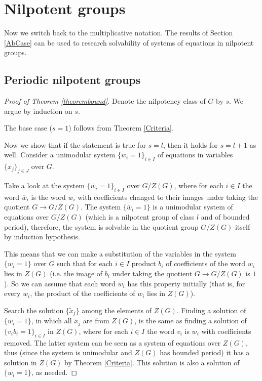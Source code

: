 \documentclass{article}
\theoremstyle{definition}
\theoremstyle{remark}
\let\tilde\widetilde
\begin{document}
\section{Nilpotent groups} \label{NilpCase}

Now we switch back to the multiplicative notation.
The results of Section \ref{AbCase} can be used to research
solvability of systems of equations in nilpotent groups.

\subsection{Periodic nilpotent groups}

\begin{proof}[Proof of Theorem \ref{theorembound}]
Denote the nilpotency class of $G$ by $s$.
We argue by induction on $s$.

The base case ($s=1$) follows from Theorem \ref{Criteria}.

Now we show that if the statement is true for
$s=l$,
then it holds for $s=l+1$ as well.
Consider a unimodular system $\{w_i=1\}_{i\in I}$
of equations in variables $\{x_j\}_{j \in J}$ over $G$.

Take a look at the system $\{\overline{w}_i=1\}_{i\in I}$ over $G/Z(G)$,
where for each $i \in I$ the word $\overline{w}_i$ is
the word $w_i$ with coefficients changed to their images
under taking the quotient $G \to G/Z(G)$.
The system $\{\overline{w}_i=1\}$ is a unimodular system of equations
over $G/Z(G)$ (which is a nilpotent group of class $l$
and of bounded period),
therefore, the system is solvable in the quotient group
$G/Z(G)$ itself by induction hypothesis.

This means that we can make a substitution of the variables
in the system $\{w_i=1\}$ over $G$
such that for each $i \in I$ product $b_i$ of coefficients of the word $w_i$
lies in $Z(G)$
(i.e. the image of $b_i$ under taking the quotient $G \to G/Z(G)$ is $1$).
So we can assume that each word $w_i$ has this property initially
(that is, for every $w_i$, the product of the coefficients of $w_i$ lies in $Z(G)$).

Search the solution $\{\tilde x_j\}$ among the elements of $Z(G)$.
Finding a solution of $\{w_i=1\}$, in which all $\tilde x_j$ are
from $Z(G)$, is the same as finding a solution of $\{v_ib_i=1\}_{i \in I}$
in $Z(G)$, where for each $i \in I$ the word $v_i$ is $w_i$ with coefficients removed.
The latter system can be seen as a system of equations over $Z(G)$,
thus (since the system is unimodular and $Z(G)$ has bounded period)
it has a solution in $Z(G)$ by Theorem \ref{Criteria}.
This solution is also a solution of $\{w_i=1\}$, as needed.
\end{proof}
\end{document}
